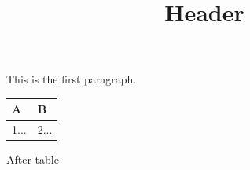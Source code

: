 \documentclass[11pt,a4paper]{article}
\title{Header}
\begin{document}
\maketitle

This is the first paragraph.

\begin{table}[h]
\begin{tabular}{|l|l|}
\hline
A & B \\ \hline
1... & 2... \\ \hline
\end{tabular}
\end{table}

After table
\end{document}
